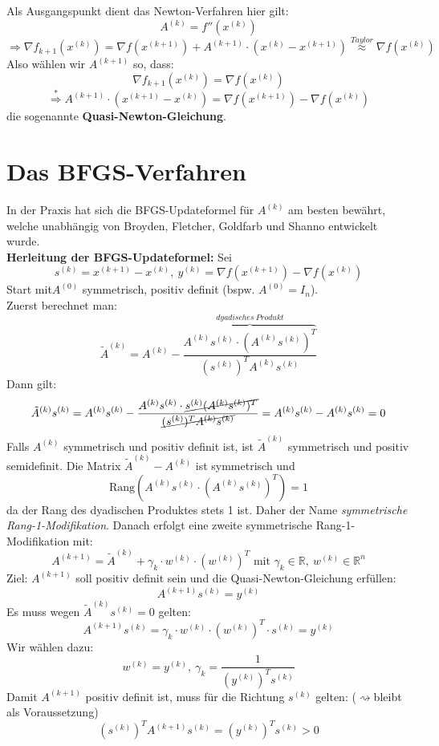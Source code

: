 Als Ausgangspunkt dient das Newton-Verfahren hier gilt:
\[A^{(k)}=f''(x^{(k)})\]
\[\Rightarrow\nabla f_{k+1}(x^{(k)})=\nabla f(x^{(k+1)})+A^{(k+1)}\cdot (x^{(k)}-x^{(k+1)})\overset{Taylor}{\approx}\nabla f(x^{(k)})\tag{*}\]
Also wählen wir $A^{(k+1)}$ so, dass:
\[\nabla f_{k+1}(x^{(k)})=\nabla f(x^{(k)})\]
\begin{equation}
\overset{*}{\Rightarrow}A^{(k+1)}\cdot (x^{(k+1)}-x^{(k)}) = \nabla f(x^{(k+1)})-\nabla f(x^{(k)})
\end{equation}
die sogenannte \textbf{Quasi-Newton-Gleichung}.\\

\section{Das BFGS-Verfahren}
In der Praxis hat sich die BFGS-Updateformel für $A^{(k)}$ am besten bewährt,
welche unabhängig von Broyden, Fletcher, Goldfarb und Shanno
entwickelt wurde. \\

\textbf{Herleitung der BFGS-Updateformel:} Sei
\[s^{(k)}=x^{(k+1)}-x^{(k)},\ y^{(k)}=\nabla f(x^{(k+1)}) - \nabla f(x^{(k)})\]
Start mit$A^{(0)}$ symmetrisch, positiv definit (bspw. $A^{(0)}=I_n$).\\ 
Zuerst berechnet man:
\[\tilde{A}^{(k)} = A^{(k)}-\frac{\overbrace{A^{(k)}s^{(k)}\cdot (A^{(k)}s^{(k)})^T}^{dyadisches\ Produkt}}{(s^{(k)})^TA^{(k)}s^{(k)}}\]
Dann gilt:
\[\tilde{A}^{(k)}s^{(k)} = A^{(k)}s^{(k)} - \frac{A^{(k)}s^{(k)}\cdot \cancel{s^{(k)}(A^{(k)}s^{(k)})^T}}{\cancel{(s^{(k)})^TA^{(k)}s^{(k)}}} = A^{(k)}s^{(k)} - A^{(k)}s^{(k)} = 0\]
Falls $A^{(k)}$ symmetrisch und positiv definit ist, ist $\tilde{A}^{(k)}$ symmetrisch und positiv semidefinit. Die Matrix $\tilde{A}^{(k)} - A^{(k)}$ ist symmetrisch und
\[\text{Rang}(A^{(k)}s^{(k)}\cdot (A^{(k)}s^{(k)})^T) = 1\]
da der Rang des dyadischen Produktes stets 1 ist. Daher der Name \emph{symmetrische Rang-1-Modifikation}. Danach erfolgt eine zweite symmetrische Rang-1-Modifikation mit:
\[A^{(k+1)} = \tilde{A}^{(k)}+\gamma_k\cdot w^{(k)}\cdot (w^{(k)})^T\text{ mit }\gamma_k\in\mathbb{R},\ w^{(k)}\in\mathbb{R}^n\]
Ziel: $A^{(k+1)}$ soll positiv definit sein und die Quasi-Newton-Gleichung erfüllen:
\[A^{(k+1)}s^{(k)} = y^{(k)}\]
Es muss wegen $\tilde{A}^{(k)}s^{(k)} =0$ gelten:
\[A^{(k+1)}s^{(k)} = \gamma_k\cdot w^{(k)}\cdot (w^{(k)})^T\cdot s^{(k)} = y^{(k)}\]
Wir wählen dazu:
\[w^{(k)} = y^{(k)},\ \gamma_k=\frac{1}{(y^{(k)})^Ts^{(k)}}\]
Damit $A^{(k+1)}$ positiv definit ist, muss für die Richtung $s^{(k)}$ gelten: ($\rightsquigarrow$bleibt als Voraussetzung)
\begin{equation}
(s^{(k)})^T A^{(k+1)} s^{(k)} = (y^{(k)})^Ts^{(k)} > 0
\end{equation}

